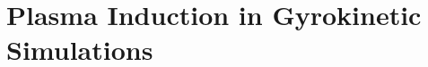 
\chapter{Plasma Induction in Gyrokinetic Simulations}
\label{chap:methods}

\thispagestyle{empty}
\newpage